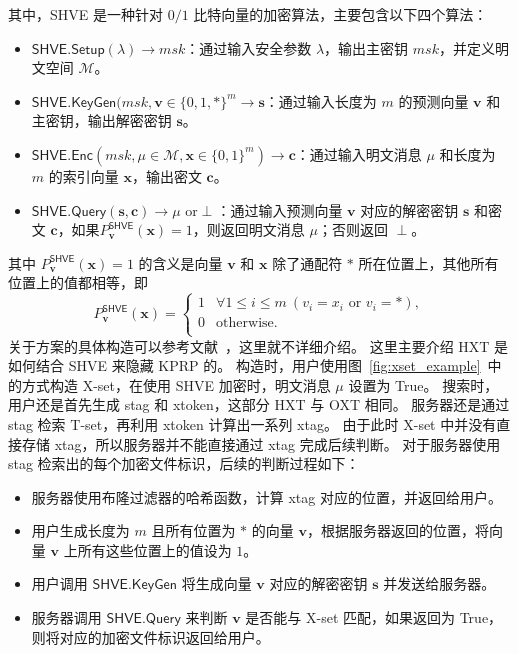 其中，SHVE 是一种针对 $0/1$ 比特向量的加密算法，主要包含以下四个算法：
\begin{itemize}
  \item $\mathsf{SHVE}.\mathsf{Setup}(\lambda) \to msk$：通过输入安全参数 $\lambda$，输出主密钥 $msk$，并定义明文空间 $\mathcal{M}$。
  \item $\mathsf{SHVE}.\mathsf{KeyGen}(msk, \mathbf{v} \in \{0,1,*\}^m \to \mathbf{s} $：通过输入长度为 $m$ 的预测向量 $\mathbf{v}$ 和主密钥，输出解密密钥 $\mathbf{s}$。
  \item $\mathsf{SHVE}.\mathsf{Enc}(msk, \mu\in \mathcal{M}, \mathbf{x} \in \{0,1\}^m ) \to \mathbf{c}$：通过输入明文消息 $\mu$ 和长度为 $m$ 的索引向量 $\mathbf{x}$，输出密文 $\mathbf{c}$。
  \item $\mathsf{SHVE}.\mathsf{Query}(\mathbf{s}, \mathbf{c}) \to \mu \mbox{ or} \perp$：通过输入预测向量 $\mathbf{v}$ 对应的解密密钥 $\mathbf{s}$ 和密文 $\mathbf{c}$，如果$P_{\mathbf{v}}^{\mathsf{SHVE}}(\mathbf{x}) = 1$，则返回明文消息 $\mu$；否则返回 $\perp$。
\end{itemize}
其中 $P_{\mathbf{v}}^{\mathsf{SHVE}}(\mathbf{x})=1$ 的含义是向量 $\mathbf{v}$ 和 $\mathbf{x}$ 除了通配符 $*$ 所在位置上，其他所有位置上的值都相等，即
\begin{equation}
  P_{\mathbf{v}}^{\mathsf{SHVE}}(\mathbf{x}) = \left\{
  \begin{array}{ll}
  1 & \forall 1\leq i \leq m \  (v_i = x_i \mbox{ or } v_i=*), \\
  0 & \mbox{otherwise}. \\
  \end{array}
  \right.
\end{equation}
关于方案的具体构造可以参考文献~\cite{lai2018result}，这里就不详细介绍。
这里主要介绍 HXT 是如何结合 SHVE 来隐藏 KPRP 的。
构造时，用户使用图~\ref{fig:xset_example}~中的方式构造 X-set，在使用 SHVE 加密时，明文消息 $\mu$ 设置为 True。
搜索时，用户还是首先生成 stag 和 xtoken，这部分 HXT 与 OXT 相同。
服务器还是通过 stag 检索 T-set，再利用 xtoken 计算出一系列 xtag。
由于此时 X-set 中并没有直接存储 xtag，所以服务器并不能直接通过 xtag 完成后续判断。
对于服务器使用 stag 检索出的每个加密文件标识，后续的判断过程如下：
\begin{itemize}
  \item 服务器使用布隆过滤器的哈希函数，计算 xtag 对应的位置，并返回给用户。
  \item 用户生成长度为 $m$ 且所有位置为 $*$ 的向量 $\mathbf{v}$，根据服务器返回的位置，将向量 $\mathbf{v}$ 上所有这些位置上的值设为 $1$。
  \item 用户调用 $\mathsf{SHVE}.\mathsf{KeyGen}$ 将生成向量 $\mathbf{v}$ 对应的解密密钥 $\mathbf{s}$ 并发送给服务器。
  \item 服务器调用 $\mathsf{SHVE}.\mathsf{Query}$ 来判断 $\mathbf{v}$ 是否能与 X-set 匹配，如果返回为 True，则将对应的加密文件标识返回给用户。
\end{itemize}
